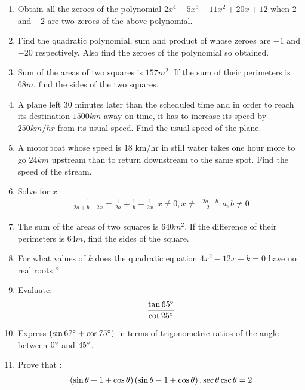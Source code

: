 \begin{enumerate}
\item Obtain all the zeroes of the polynomial $2x^4 - 5x^3 - 11x^2 + 20x + 12$ when $ 2 $ and $ -2 $ are two zeroes of the above polynomial. 

\item Find the quadratic polynomial, sum and product of whose zeroes are $-1$ and $-20$ respectively. Also find the zeroes of the polynomial so obtained.

\item Sum of the areas of two squares is $157 m^2$. If the sum of their perimeters is $68 m$, find the sides of the two squares.

\item A plane left $30$ minutes later than the scheduled time and in order to reach its destination $1500 km$ away on time, it has to increase its speed by $250 km/hr$ from its usual speed. Find the usual speed of the plane.

\item A motorboat whose speed is $18$ km/hr in still water takes one hour more to go $24 km$ upstream than to return downstream to the same spot. Find the speed of the stream.

\item Solve for $x$ :
\begin{align*}
    \frac{1}{2a+ b +2x} = \frac{1}{2a}+\frac{1}{b}+\frac{1}{2x}; x\neq0, x\neq\frac{-2a-b}{2}, a, b\neq0
\end{align*}

\item The sum of the areas of two squares is $640 m^2$. If the difference of their perimeters is $64m$, find the sides of the square.

\item For what values of $k$ does the quadratic equation $4x^2 - 12x - k = 0$ have 
no real roots ?
\item  Evaluate:
\begin{align*}
    \frac {\tan 65\degree}  {\cot 25\degree}
\end{align*}

\item Express $\left({\sin 67\degree}+ {\cos 75\degree}\right)$ in terms of trigonometric ratios of the angle between $0\degree$ and $45\degree$.

\item Prove that :
\begin{align*}
    \left(\sin \theta+1+\cos \theta\right) \left(\sin\theta-1+\cos\theta\right).\sec\theta \csc\theta=2
\end{align*}


\end{enumerate}
